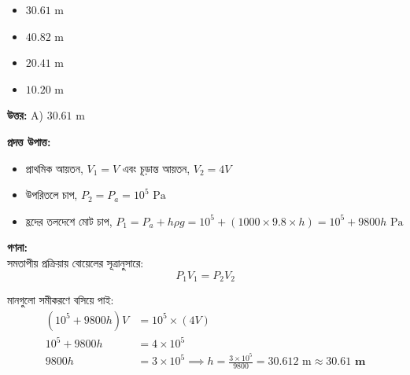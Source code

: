 \documentclass[12pt, a4paper]{article}
\begin{document}
\begin{itemize}[label={}, leftmargin=1cm, itemsep=0.5em]
    \item[\textbf{A)}] $30.61\text{ m}$
    \item[\textbf{B)}] $40.82\text{ m}$
    \item[\textbf{C)}] $20.41\text{ m}$
    \item[\textbf{D)}] $10.20\text{ m}$
\end{itemize}

\vspace{0.5em}
\begin{tcolorbox}[answerbox]
    \textbf{\color{success} উত্তর:} A) $30.61\text{ m}$
\end{tcolorbox}
\vspace{1em}

\begin{tcolorbox}[solutionbox={সমাধান (Solution)}]
    \noindent
    \textbf{প্রদত্ত উপাত্ত:}
    \begin{itemize}[leftmargin=1.5em, itemsep=0.2em]
        \item প্রাথমিক আয়তন, $V_1 = V$ এবং চূড়ান্ত আয়তন, $V_2 = 4V$
        \item উপরিতলে চাপ, $P_2 = P_a = 10^5\text{ Pa}$
        \item হ্রদের তলদেশে মোট চাপ, $P_1 = P_a + h \rho g = 10^5 + (1000 \times 9.8 \times h) = 10^5 + 9800h\text{ Pa}$
    \end{itemize}

    \vspace{0.6em}
    \noindent\textbf{গণনা:} \\
    সমতাপীয় প্রক্রিয়ায় বোয়েলের সূত্রানুসারে:
    \[ P_1 V_1 = P_2 V_2 \]
    
    মানগুলো সমীকরণে বসিয়ে পাই:
    \begin{align*}
        (10^5 + 9800h) V &= 10^5 \times (4V) \\
        10^5 + 9800h &= 4 \times 10^5 \\
        9800h &= 3 \times 10^5 \implies h = \frac{3 \times 10^5}{9800} = 30.612\text{ m} \approx \mathbf{30.61\text{ m}}
    \end{align*}
\end{tcolorbox}
\end{document}
